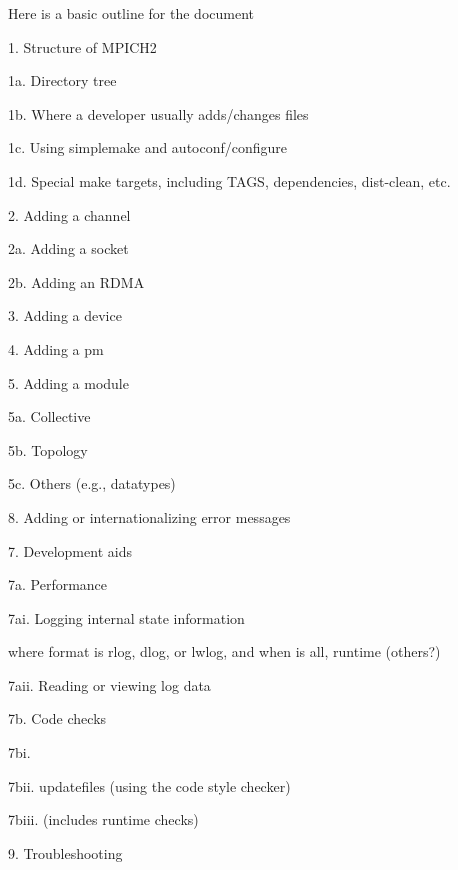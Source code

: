 \documentclass[dvipdfm,11pt]{article}
\begin{document}

\cleardoublepage

\tableofcontents
\clearpage

\pagestyle{headings}

Here is a basic outline for the document

1. Structure of MPICH2 

   1a. Directory tree

   1b. Where a developer usually adds/changes files

   1c. Using simplemake and autoconf/configure
 
   1d. Special make targets, including TAGS, dependencies, dist-clean, etc.

2. Adding a channel

2a. Adding a socket

2b. Adding an RDMA

3. Adding a device

4. Adding a pm

5. Adding a module

  5a. Collective

  

  5b. Topology

  5c. Others (e.g., datatypes)

8. Adding or internationalizing error messages

7. Development aids

  7a. Performance

      7ai. Logging internal state information
  

      where format is rlog, dlog, or lwlog, and when is all, runtime (others?)

      7aii. Reading or viewing log data

   7b. Code checks
 
      7bi. 

      7bii.  updatefiles (using the code style checker)

      7biii.  (includes runtime checks)

9. Troubleshooting
\end{document}
